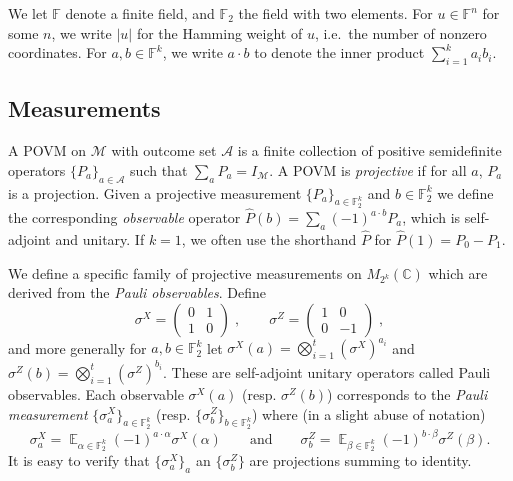 \documentclass[11pt]{article}
\theoremstyle{definition}
\newcommand{\Id}{\ensuremath{I}}
\DeclareMathOperator*{\Expectation}{\mathbb{E}}
\newcommand{\Es}[1]{\Expectation_{#1}}
\newcommand{\field}{\mathbb{F}_2}
\newcommand{\C}{\ensuremath{\mathbb{C}}}
\newcommand{\F}{\ensuremath{\mathbb{F}}}
\newcommand{\mA}{\ensuremath{\mathcal{A}}}
\newcommand{\mM}{\ensuremath{\mathcal{M}}}
\begin{document}
	We let $\F$ denote a finite field, and $\field$ the field with two elements. For $u\in \F^n$ for some $n$, we write $|u|$ for the Hamming weight of $u$, i.e.\ the number of nonzero coordinates. For $a,b \in \F^k$, we write $a \cdot b$ to denote the inner product $\sum_{i=1}^k a_i b_i$. 
	
	
	\subsection{Measurements}
	\label{sec:measurements}
	
	A POVM on $\mM$ with outcome set $\mA$ is a finite collection of positive semidefinite operators $\{P_a\}_{a\in \mA}$ such that $\sum_a P_a = \Id_\mM$. A POVM is \emph{projective} if for all $a$, $P_a$ is a projection. 
	Given a projective measurement $\{P_a\}_{a\in \field^k}$ and $b\in \field^k$ we define the corresponding \emph{observable} operator $\widehat{P}(b) = \sum_a (-1)^{a\cdot b} P_a$, which is self-adjoint and unitary. If $k=1$, we often use the shorthand $\widehat{P}$ for $\widehat{P}(1) = P_0-P_1$.
	
	We define a specific family of projective measurements on $M_{2^k}(\C)$ which are derived from the \emph{Pauli observables}. Define
	\[ \sigma^X = \begin{pmatrix} 0 & 1 \\ 1 & 0 \end{pmatrix}\;,\qquad \sigma^Z = \begin{pmatrix} 1 & 0 \\ 0 & -1\end{pmatrix}\;,\]
	and more generally for $a,b\in \F_2^k$ let $\sigma^X(a) = \bigotimes_{i=1}^t (\sigma^X)^{a_i}$ and $\sigma^Z(b) = \bigotimes_{i=1}^t (\sigma^Z)^{b_i}$. These are self-adjoint unitary operators called Pauli observables. Each observable $\sigma^X(a)$ (resp. $\sigma^Z(b)$) corresponds to the \emph{Pauli measurement} $\{ \sigma^X_a \}_{a \in \F_2^k}$ (resp. $\{ \sigma^Z_b \}_{b \in \F_2^k}$) where (in a slight abuse of notation)  
	\[ \sigma^X_a = \Es{\alpha\in\F_2^k} (-1)^{a\cdot \alpha} \sigma^X(\alpha)\qquad\text{and}\qquad\sigma^Z_b = \Es{\beta\in\F_2^k} (-1)^{b\cdot\beta} \sigma^Z(\beta).\]
	It is easy to verify that $\{\sigma^X_a\}_a$ an $\{\sigma^Z_b\}$ are projections summing to identity.
	
	
	
\end{document}
